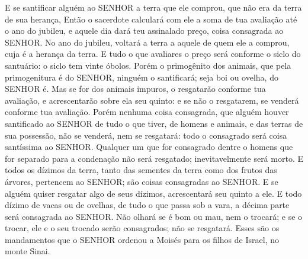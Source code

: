 {E se santificar alguém ao SENHOR a terra que ele comprou, que não era da terra de sua herança,
Então o sacerdote calculará com ele a soma de tua avaliação até o ano do jubileu, e aquele dia dará teu assinalado preço, coisa consagrada ao SENHOR.
No ano do jubileu, voltará a terra a aquele de quem ele a comprou, cuja é a herança da terra.
E tudo o que avaliares o preço será conforme o siclo do santuário: o siclo tem vinte óbolos.
Porém o primogênito dos animais, que pela primogenitura é do SENHOR, ninguém o santificará; seja boi ou ovelha, do SENHOR é.
Mas se for dos animais impuros, o resgatarão conforme tua avaliação, e acrescentarão sobre ela seu quinto: e se não o resgatarem, se venderá conforme tua avaliação.
Porém nenhuma coisa consagrada, que alguém houver santificado ao SENHOR de tudo o que tiver, de homens e animais, e das terras de sua possessão, não se venderá, nem se resgatará: todo o consagrado será coisa santíssima ao SENHOR.
Qualquer um que for consagrado dentre o homens que for separado para a condenação não será resgatado; inevitavelmente será morto.
E todos os dízimos da terra, tanto das sementes da terra como dos frutos das árvores, pertencem ao SENHOR; são coisas consagradas ao SENHOR.
E se alguém quiser resgatar algo de seus dízimos, acrescentará seu quinto a ele.
E todo dízimo de vacas ou de ovelhas, de tudo o que passa sob a vara, a décima parte será consagrada ao SENHOR.
Não olhará se é bom ou mau, nem o trocará; e se o trocar, ele e o seu trocado serão consagrados; não se resgatará.
Esses são os mandamentos que o SENHOR ordenou a Moisés para os filhos de Israel, no monte Sinai.\par }